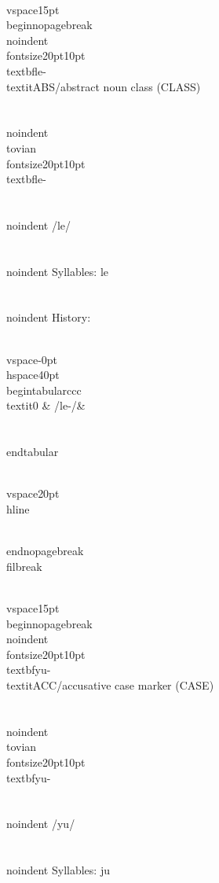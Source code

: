 \\vspace{15pt}
\\begin{nopagebreak}
\\noindent{\\fontsize{20pt}{10pt}\\textbf{le-} } \\textit{ABS/abstract noun class} (CLASS)\\\\
\\noindent {\\tovian \\fontsize{20pt}{10pt} \\textbf{le-} }\\\\
\\noindent /l{\textprimstress}e/\\\\
\\noindent Syllables: le\\\\


\\noindent History:

\\vspace{-0pt}
\\hspace{40pt}
\\begin{tabular}{ccc}
\\textit{0} & /le-/& \\\\
\\end{tabular}

\\vspace{20pt}\\hline

\\end{nopagebreak}
\\filbreak



\\vspace{15pt}
\\begin{nopagebreak}
\\noindent{\\fontsize{20pt}{10pt}\\textbf{yu-} } \\textit{ACC/accusative case marker} (CASE)\\\\
\\noindent {\\tovian \\fontsize{20pt}{10pt} \\textbf{yu-} }\\\\
\\noindent /y{\textprimstress}u/\\\\
\\noindent Syllables: ju\\\\


